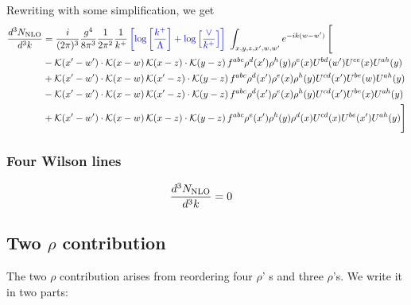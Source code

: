 \documentclass[aps,prd,amsmath,amssymb,nofootinbib]{revtex4-2}
\numberwithin{equation}{section}
\begin{document}
Rewriting with some simplification, we get
\begin{align}
      \frac{d^{3}N_{\rm NLO}}{d^{3}k} & = \frac{i}{(2\pi)^{3}}\frac{g^{4}}{8\pi^{3}}\frac{1}{2\pi^{2}} \frac{1}{k^{+}}\,{\color{blue}\left[\log{\left[\frac{k^{+}}{\Lambda}\right]}+\log{\left[\frac{\vee}{k^{+}}\right]}\right]}\,\,\int_{x,y,z,x^{\prime},w,w^{\prime}}e^{-ik(w-w^{\prime})}\, \Bigg[\notag \\ & - \mathcal{K}(x'-w')\cdot \mathcal{K}(x-w)\, \mathcal{K}(x-z)\cdot \mathcal{K}(y-z)\, f^{a b c} \rho^{d}(x') \rho^{h}(y) \rho^{e}(x) U^{bd}(w') U^{ce}(x) U^{a h}(y)\nonumber\\
    &+ \mathcal{K}(x'-w')\cdot \mathcal{K}(x-w)\,\mathcal{K}(x'-z)\cdot \mathcal{K}(y-z)\, f^{a b c} \rho^{d}(x') \rho^{e}(x) \rho^{h}(y) U^{cd}(x') U^{be}(w) U^{a h}(y)\nonumber\\
    &- \mathcal{K}(x'-w')\cdot \mathcal{K}(x-w)\,\mathcal{K}(x'-z)\cdot \mathcal{K}(y-z)\, f^{a b c} \rho^{d}(x') \rho^{e}(x) \rho^{h}(y) U^{cd}(x') U^{b e}(x) U^{a h}(y)\nonumber\\
    &+  \mathcal{K}(x'-w')\cdot \mathcal{K}(x-w)\, \mathcal{K}(x-z)\cdot \mathcal{K}(y-z)\, f^{a b c} \rho^{e}(x') \rho^{h}(y) \rho^{d}(x) U^{cd}(x) U^{b e}(x') U^{a h}(y) \Bigg]
\end{align}
\subsubsection{Four Wilson lines}
\begin{align}
    \frac{d^{3}N_{\rm NLO}}{d^{3}k} & = 0 
\end{align}    
\subsection{Two $\rho$ contribution}
The two $\rho$ contribution arises from reordering four $\rho$' s and three $\rho$'s. We write it in two parts:
\end{document}
